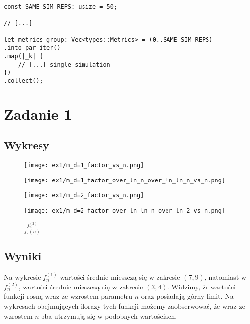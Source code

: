\documentclass{article}
\begin{document}
\begin{verbatim}
const SAME_SIM_REPS: usize = 50;

// [...]

let metrics_group: Vec<types::Metrics> = (0..SAME_SIM_REPS)
.into_par_iter()
.map(|_k| {
    // [...] single simulation
})
.collect();
\end{verbatim}

\section{Zadanie 1}

\subsection{Wykresy}

\begin{figure}[H]
    \centering
        \begin{minipage}{0.24\textwidth}
        \centering
        \texttt{[image: ex1/m\_d=1\_factor\_vs\_n.png]}
        \caption{$f_n^{(1)}$}
    \end{minipage}
        \begin{minipage}{0.24\textwidth}
        \centering
        \texttt{[image: ex1/m\_d=1\_factor\_over\_ln\_n\_over\_ln\_ln\_n\_vs\_n.png]}
        \caption{$\frac{f_n^{(1)}}{f_1(n)}$}
    \end{minipage}
        \begin{minipage}{0.24\textwidth}
        \centering
        \texttt{[image: ex1/m\_d=2\_factor\_vs\_n.png]}
        \caption{$f_n^{(2)}$}
    \end{minipage}
    \begin{minipage}{0.24\textwidth}
        \centering
        \texttt{[image: ex1/m\_d=2\_factor\_over\_ln\_ln\_n\_over\_ln\_2\_vs\_n.png]}
        \caption{$\frac{f_n^{(2)}}{f_2(n)}$}
    \end{minipage}
\end{figure}

\subsection{Wyniki}

Na wykresie $f_n^{(1)}$ wartości średnie mieszczą się w zakresie $(7,9)$, natomiast w $f_n^{(2)}$, wartości średnie mieszczą się w zakresie $(3,4)$. Widzimy, że wartości funkcji rosną wraz ze wzrostem parametru $n$ oraz posiadają górny limit. Na wykresach obejmujących ilorazy tych funkcji możemy zaobserwować, że wraz ze wzrostem $n$ oba utrzymują się w podobnych wartościach.
\end{document}
